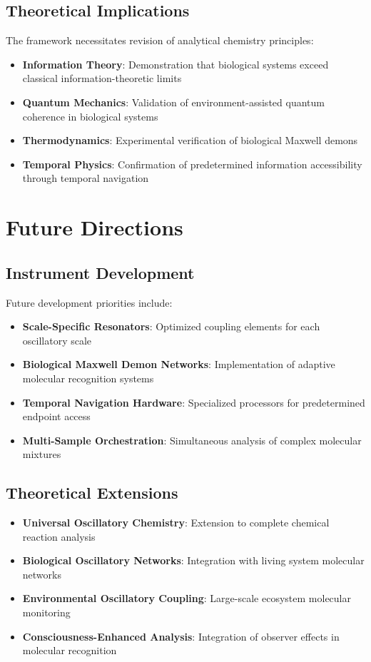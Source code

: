 \documentclass[12pt,a4paper]{article}
\begin{document}
\subsection{Theoretical Implications}

The framework necessitates revision of analytical chemistry principles:

\begin{itemize}
\item \textbf{Information Theory}: Demonstration that biological systems exceed classical information-theoretic limits
\item \textbf{Quantum Mechanics}: Validation of environment-assisted quantum coherence in biological systems
\item \textbf{Thermodynamics}: Experimental verification of biological Maxwell demons
\item \textbf{Temporal Physics}: Confirmation of predetermined information accessibility through temporal navigation
\end{itemize}

\section{Future Directions}

\subsection{Instrument Development}

Future development priorities include:

\begin{itemize}
\item \textbf{Scale-Specific Resonators}: Optimized coupling elements for each oscillatory scale
\item \textbf{Biological Maxwell Demon Networks}: Implementation of adaptive molecular recognition systems
\item \textbf{Temporal Navigation Hardware}: Specialized processors for predetermined endpoint access
\item \textbf{Multi-Sample Orchestration}: Simultaneous analysis of complex molecular mixtures
\end{itemize}

\subsection{Theoretical Extensions}

\begin{itemize}
\item \textbf{Universal Oscillatory Chemistry}: Extension to complete chemical reaction analysis
\item \textbf{Biological Oscillatory Networks}: Integration with living system molecular networks
\item \textbf{Environmental Oscillatory Coupling}: Large-scale ecosystem molecular monitoring
\item \textbf{Consciousness-Enhanced Analysis}: Integration of observer effects in molecular recognition
\end{itemize}
\end{document}
